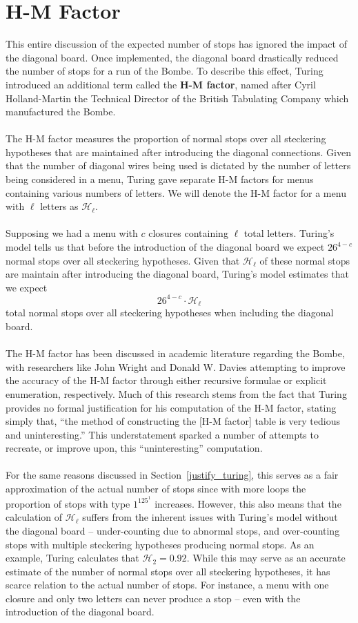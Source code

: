 \section{H-M Factor}
This entire discussion of the expected number of stops has ignored
the impact of the diagonal board. Once implemented, the diagonal
board drastically reduced the number of stops for a run of the Bombe.
To describe this effect, Turing introduced an additional term called
the {\bf{H-M factor}}, named after Cyril Holland-Martin the Technical
Director of the British Tabulating Company which manufactured the Bombe.
\\\\The H-M factor measures the proportion of normal stops over all
steckering hypotheses that are maintained after introducing the
diagonal connections. Given that the number of diagonal wires being
used is dictated by the number of letters being considered in a menu,
Turing gave separate H-M factors for menus containing various numbers
of letters. We will denote the H-M factor for a menu with $\ell$ letters
as $\mathcal{H}_\ell$.
\\\\Supposing we had a menu with $c$ closures containing $\ell$ total
letters. Turing's model tells us that before the introduction of the
diagonal board we expect $26^{4-c}$ normal stops over all steckering
hypotheses. Given that $\mathcal{H}_\ell$ of these normal stops are
maintain after introducing the diagonal board, Turing's model
estimates that we expect
\[
  26^{4-c}\cdot\mathcal{H}_\ell
\]
total normal stops over all steckering hypotheses when including the
diagonal board.
\\\\The H-M factor has been discussed in academic literature
regarding the Bombe, with researchers like John Wright and Donald W.
Davies attempting to improve the accuracy of the H-M factor through
either recursive formulae or explicit enumeration, respectively. Much
of this research stems from the fact that Turing provides no formal
justification for his computation of the H-M factor, stating simply
that, ``the method of constructing the [H-M factor] table is very
tedious and uninteresting.'' This understatement sparked a number of
attempts to recreate, or improve upon, this ``uninteresting'' computation.
\\\\For the same reasons discussed in Section~\ref{justify_turing},
this serves as a fair approximation of the actual number of stops
since with more loops the proportion of stops with type $1^125^1$
increases. However, this also means that the calculation of
$\mathcal{H}_\ell$ suffers from the inherent issues with Turing's model
without the diagonal board -- under-counting due to abnormal stops,
and over-counting stops with multiple steckering hypotheses producing
normal stops. As an example, Turing calculates that $\mathcal{H}_2 =
0.92$. While this may serve as an accurate estimate of the number of
normal stops over all steckering hypotheses, it has scarce relation
to the actual number of stops. For instance, a menu with one closure
and only two letters can never produce a stop -- even with the
introduction of the diagonal board.
